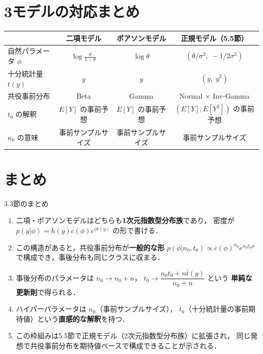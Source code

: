 \documentclass[lualatex,ja=standard,a4paper,12pt]{bxjsarticle}
\begin{document}
\section{3モデルの対応まとめ}

\begin{center}
\renewcommand{\arraystretch}{1.8}
\begin{tabular}{lccc}
\toprule
& \textbf{二項モデル} & \textbf{ポアソンモデル} & \textbf{正規モデル（5.5節）} \\
\midrule
自然パラメータ $\phi$ & $\log\frac{\theta}{1-\theta}$ & $\log\theta$ & $(\theta/\sigma^2,\; -1/2\sigma^2)$ \\
十分統計量 $t(y)$ & $y$ & $y$ & $(y,\; y^2)$ \\
共役事前分布 & Beta & Gamma & Normal $\times$ Inv-Gamma \\
$t_0$ の解釈 & $E[Y]$ の事前予想 & $E[Y]$ の事前予想 & $(E[Y], E[Y^2])$ の事前予想 \\
$n_0$ の意味 & 事前サンプルサイズ & 事前サンプルサイズ & 事前サンプルサイズ \\
\bottomrule
\end{tabular}
\end{center}

\section{まとめ}

\begin{thmbox}{3.3節のまとめ}
\begin{enumerate}
  \item 二項・ポアソンモデルはどちらも\textbf{1次元指数型分布族}であり，
        密度が $p(y|\phi) = h(y)c(\phi)e^{\phi t(y)}$ の形で書ける．

  \item この構造があると，共役事前分布が\textbf{一般的な形}
        $p(\phi|n_0, t_0) \propto c(\phi)^{n_0} e^{n_0 t_0 \phi}$
        で構成でき，事後分布も同じクラスに収まる．

  \item 事後分布のパラメータは $n_0 \to n_0 + n$，
        $t_0 \to \dfrac{n_0 t_0 + n\bar{t}(y)}{n_0+n}$ という
        \textbf{単純な更新則}で得られる．

  \item ハイパーパラメータは $n_0$（事前サンプルサイズ），
        $t_0$（十分統計量の事前期待値）という\textbf{直感的な解釈}を持つ．

  \item この枠組みは5.5節で正規モデル（2次元指数型分布族）に拡張され，
        同じ発想で共役事前分布を期待値ベースで構成できることが示される．
\end{enumerate}
\end{thmbox}
\end{document}
